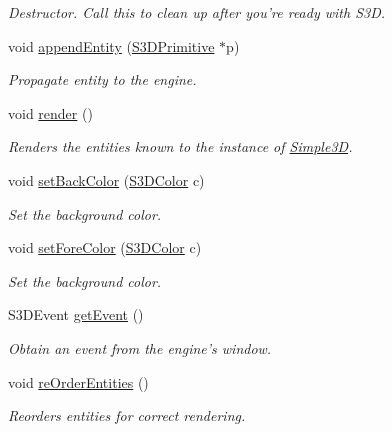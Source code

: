 \begin{DoxyCompactItemize}
\begin{DoxyCompactList}\small\item\em Destructor. Call this to clean up after you're ready with S3D. \item\end{DoxyCompactList}\item 
void \hyperlink{class_simple3_d_abe4d7beed767d1d24154738fad7ac1a7}{appendEntity} (\hyperlink{class_s3_d_primitive}{S3DPrimitive} $\ast$p)
\begin{DoxyCompactList}\small\item\em Propagate entity to the engine. \item\end{DoxyCompactList}\item 
void \hyperlink{class_simple3_d_ab98d8b6cfb6abf91b43a035ab36f75f8}{render} ()
\begin{DoxyCompactList}\small\item\em Renders the entities known to the instance of \hyperlink{class_simple3_d}{Simple3D}. \item\end{DoxyCompactList}\item 
void \hyperlink{class_simple3_d_a2e1f61afda5ab9cb2a1abd05a856c5d7}{setBackColor} (\hyperlink{struct_s3_d_color}{S3DColor} c)
\begin{DoxyCompactList}\small\item\em Set the background color. \item\end{DoxyCompactList}\item 
void \hyperlink{class_simple3_d_a9dd0eb5a220c4490656dc3dd5cc79857}{setForeColor} (\hyperlink{struct_s3_d_color}{S3DColor} c)
\begin{DoxyCompactList}\small\item\em Set the background color. \item\end{DoxyCompactList}\item 
S3DEvent \hyperlink{class_simple3_d_a8f6621e3e0b4bfae3011514e7fc73003}{getEvent} ()
\begin{DoxyCompactList}\small\item\em Obtain an event from the engine's window. \item\end{DoxyCompactList}\item 
void \hyperlink{class_simple3_d_aa0da52599eafb396ec36e3d0cf6da504}{reOrderEntities} ()
\begin{DoxyCompactList}\small\item\em Reorders entities for correct rendering. \item\end{DoxyCompactList}\end{DoxyCompactItemize}


